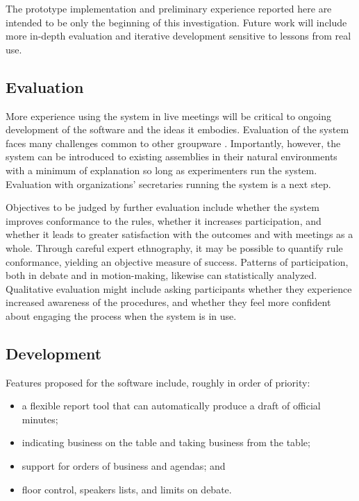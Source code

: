 \documentclass{acm_proc_article-sp}
\begin{document}
The prototype implementation and preliminary experience reported here are intended to be only the beginning of this investigation. Future work will include more in-depth evaluation and iterative development sensitive to lessons from real use.

\subsection{Evaluation}

More experience using the system in live meetings will be critical to ongoing development of the software and the ideas it embodies. Evaluation of the system faces many challenges common to other groupware \cite{grudin:groupware}. Importantly, however, the system can be introduced to existing assemblies in their natural environments with a minimum of explanation so long as experimenters run the system. Evaluation with organizations' secretaries running the system is a next step.

Objectives to be judged by further evaluation include whether the system improves conformance to the rules, whether it increases participation, and whether it leads to greater satisfaction with the outcomes and with meetings as a whole. Through careful expert ethnography, it may be possible to quantify rule conformance, yielding an objective measure of success. Patterns of participation, both in debate and in motion-making, likewise can statistically analyzed. Qualitative evaluation might include asking participants whether they experience increased awareness of the procedures, and whether they feel more confident about engaging the process when the system is in use.

\subsection{Development}

Features proposed for the software include, roughly in order of priority:

\begin{itemize}
 \item a flexible report tool that can automatically produce a draft of official minutes;
 \item indicating business on the table and taking business from the table;
 \item support for orders of business and agendas; and
 \item floor control, speakers lists, and limits on debate.
\end{itemize}
\end{document}
